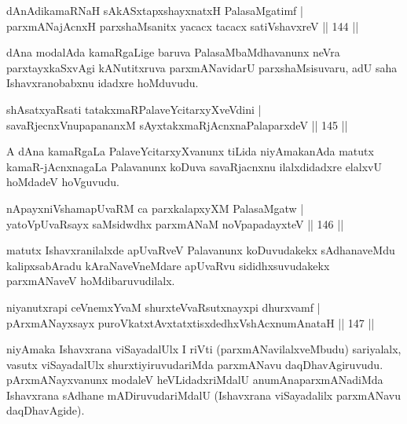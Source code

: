 \begin{shl}
dAnAdikamaRNaH sAkASxtapxshayxnatxH PalasaMgatimf |\\
parxmANajAcnxH parxshaMsanitx yacacx tacacx satiVshavxreV \hfill || 144 ||
\end{shl}

\begin{artha}
dAna modalAda kamaRgaLige baruva PalasaMbaMdhavanunx neVra parxtayxkaSxvAgi kANutitxruva parxmANavidarU parxshaMsisuvaru, adU saha Ishavxranobabxnu idadxre hoMduvudu.
\end{artha}

\begin{shl}
shAsatxyaRsati tatakxmaRPalaveYcitarxyXveVdini |\\
savaRjecnxV\s nupapananxM sAyxtakxmaRjAcnxnaPalaparxdeV \hfill || 145 ||
\end{shl}

\begin{artha}
A dAna kamaRgaLa PalaveYcitarxyXvanunx tiLida niyAmakanAda matutx kamaR-jAcnxnagaLa Palavanunx koDuva savaRjacnxnu ilalxdidadxre elalxvU hoMdadeV hoVguvudu.
\end{artha}


\begin{shl}
nApayxniVshamapUvaRM ca parxkalapxyXM PalasaMgatw |\\
yatoV\s pUvaRsayx saMsidwdhx parxmANaM noVpapadayxteV \hfill || 146 ||
\end{shl}

\begin{artha}
matutx Ishavxranilalxde apUvaRveV Palavanunx koDuvudakekx sAdhanaveMdu kalipxsabAradu kAraNaveVneMdare apUvaRvu sididhxsuvudakekx parxmANaveV hoMdibaruvudilalx.
\end{artha}

\begin{shl}
niyanutxrapi ceVnemxYvaM shurxteVvaRsutxnayxpi dhurxvamf |\\
pArxmANayxsayx puroVkatxtAvxtatxtisxdedhxVshAcxnumAnataH \hfill || 147 ||
\end{shl}

\begin{artha}%
niyAmaka Ishavxrana viSayadalUlx I riVti (parxmANavilalxveMbudu) sariyalalx, vasutx viSayadalUlx shurxtiyiruvudariMda parxmANavu daqDhavAgiruvudu. pArxmANayxvanunx modaleV heVLidadxriMdalU anumAnaparxmANadiMda Ishavxrana sAdhane mADiruvudariMdalU (Ishavxrana viSayadalilx parxmANavu daqDhavAgide).
\end{artha}

